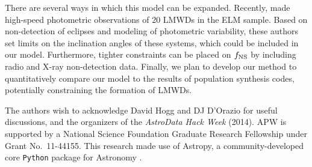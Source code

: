 \documentclass[apjl]{emulateapj}
\begin{document}
There are several ways in which this model can be expanded. Recently, \citet{hermes14} made high-speed photometric observations of 20 LMWDs in the ELM sample. Based on non-detection of eclipses and modeling of photometric variability, these authors set limits on the inclination angles of these systems, which could be included in our model. Furthermore, tighter constraints can be placed on $f_{\rm NS}$ by including radio and X-ray non-detection data. Finally, we plan to develop our method to quantitatively compare our model to the results of population synthesis codes, potentially constraining the formation of LMWDs.




\acknowledgements
The authors wish to acknowledge David Hogg and DJ D'Orazio for useful discussions, and the organizers of the \emph{AstroData Hack Week} (2014). 
APW is supported by a National Science Foundation Graduate Research Fellowship under Grant No.\ 11-44155. 
This research made use of Astropy, a community-developed core \texttt{Python} package for Astronomy \citep{astropy13}. \\


\end{document}
